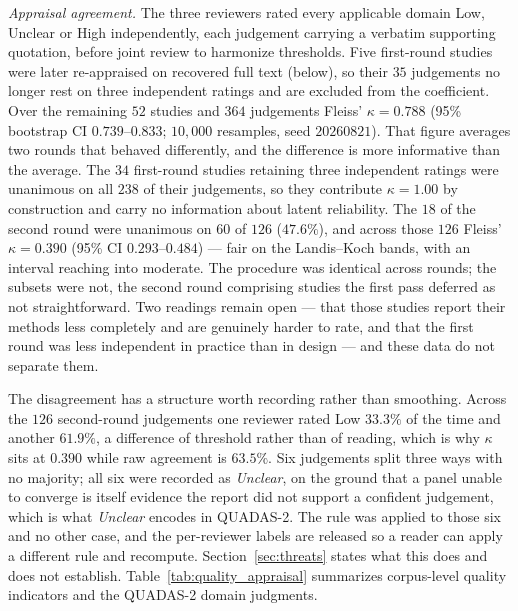 \documentclass[review,authoryear]{elsarticle}
\begin{document}
\emph{Appraisal agreement.} The three reviewers rated every applicable domain Low,
Unclear or High independently, each judgement carrying a verbatim supporting quotation,
before joint review to harmonize thresholds. Five first-round studies were later
re-appraised on recovered full text (below), so their $35$ judgements no longer rest on
three independent ratings and are excluded from the coefficient. Over the remaining $52$
studies and $364$ judgements Fleiss' $\kappa = 0.788$ (95\% bootstrap CI
$0.739$--$0.833$; $10{,}000$ resamples, seed $20260821$). That figure averages two rounds
that behaved differently, and the difference is more informative than the average. The
$34$ first-round studies retaining three independent ratings were unanimous on all $238$
of their judgements, so they contribute $\kappa = 1.00$ by construction and carry no
information about latent reliability. The $18$ of the second round were unanimous on $60$
of $126$ ($47.6\%$), and across those $126$ Fleiss' $\kappa = 0.390$ (95\% CI
$0.293$--$0.484$) --- fair on the Landis--Koch bands, with an interval reaching into
moderate. The procedure was identical across rounds; the subsets were not, the second
round comprising studies the first pass deferred as not straightforward. Two readings
remain open --- that those studies report their methods less completely and are genuinely
harder to rate, and that the first round was less independent in practice than in design
--- and these data do not separate them.

The disagreement has a structure worth recording rather than smoothing. Across the $126$
second-round judgements one reviewer rated Low $33.3\%$ of the time and another $61.9\%$,
a difference of threshold rather than of reading, which is why $\kappa$ sits at $0.390$
while raw agreement is $63.5\%$. Six judgements split three ways with no majority; all six
were recorded as \emph{Unclear}, on the ground that a panel unable to converge is itself
evidence the report did not support a confident judgement, which is what \emph{Unclear}
encodes in QUADAS-2. The rule was applied to those six and no other case, and the
per-reviewer labels are released so a reader can apply a different rule and recompute.
Section~\ref{sec:threats} states what this does and does not establish.
Table~\ref{tab:quality_appraisal} summarizes corpus-level quality indicators and the
QUADAS-2 domain judgments.
\end{document}
